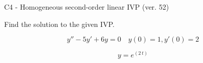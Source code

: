 \begin{exercise}
  \begin{exerciseTitle}C4 - Homogeneous second-order linear IVP (ver. 52)\end{exerciseTitle}
  \begin{exerciseStatement}
    
Find the solution to the given IVP.

    
\[y''-5y'+6y = 0 \hspace{1em} y(0) = 1 , y'(0) = 2\]

  \end{exerciseStatement}
  \begin{exerciseAnswer}
    
\[y= e^{\left(2 \, t\right)}\]

  \end{exerciseAnswer}
\end{exercise}